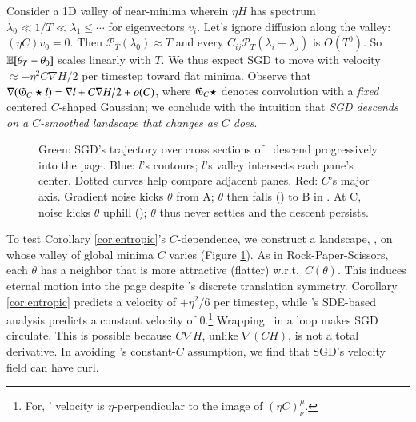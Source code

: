Consider a 1D valley of near-minima wherein $\eta H$ has spectrum
$\lambda_0 \ll 1/T \ll \lambda_1 \leq \cdots$ for eigenvectors
$v_i$.  Let's ignore diffusion along the valley: $(\eta C) v_0 =
0$.
%
Then ${\mathcal P}_T(\lambda_0)\approx T$ and every
$C_{ij}{\mathcal P}_T(\lambda_i+\lambda_j)$ is $O(T^0)$.  So $\mathbb{E}[\theta_T-\theta_0]$
scales linearly with $T$.  We thus expect SGD to move with
velocity $\approx -\eta^2 C\nabla H/2$ per timestep toward flat minima.  
Observe that $\nabla ({\frak G}_C \star l) = \nabla l+C\nabla
H/2 + o(C)$, where ${\frak G}_C \star$ denotes convolution with a
\emph{fixed} centered $C$-shaped Gaussian; we conclude with the
intuition that \emph{SGD descends on a $C$-smoothed landscape that
changes as $C$ does}.  %

\begin{figure}[h!]
    \squash
    \caption{%
        Green: SGD's trajectory over 
        cross sections of \Helix\ descend progressively
        into the page.  Blue: $l$'s contours; $l$'s valley
        intersects each pane's center.  Dotted
        curves help compare adjacent panes.
        Red: %
        $C$'s
        major axis.
        Gradient noise kicks $\theta$ from A; $\theta$ then falls
        (\hspace{-0.12cm}\protect{}) to B in {\hspace{-0.08cm}\protect{}}.  At C,
        noise kicks $\theta$ uphill (\hspace{-0.08cm}\protect{}); $\theta$
        thus never settles and the descent persists.
    }
    \squash\squash
    \label{fig:archimedes}
\end{figure}

To test Corollary \ref{cor:entropic}'s $C$-dependence,
we %
construct a landscape, \Helix, on
whose valley of global minima $C$ varies (Figure
\ref{fig:archimedes}).  As in Rock-Paper-Scissors, each 
$\theta$ has a neighbor that is more attractive (flatter) w.r.t.\
$C(\theta)$.  This induces eternal motion into the page
despite \Helix's discrete translation symmetry.
Corollary \ref{cor:entropic} predicts a velocity of
$+\eta^2/6$ per timestep, while \cite{ch18}'s SDE-based analysis
predicts a constant velocity of $0$.\footnote{
    For, \Helix' velocity is $\eta$-perpendicular to the image
    of $(\eta C)^\mu_\nu$.%
}
Wrapping \Helix\ in a loop makes SGD circulate. %
This is
possible because $C\nabla H$, unlike $\nabla(CH)$, is not a total
derivative. 
In avoiding \cite{we19b}'s constant-$C$ assumption, we 
find that SGD's velocity field can have curl. 

